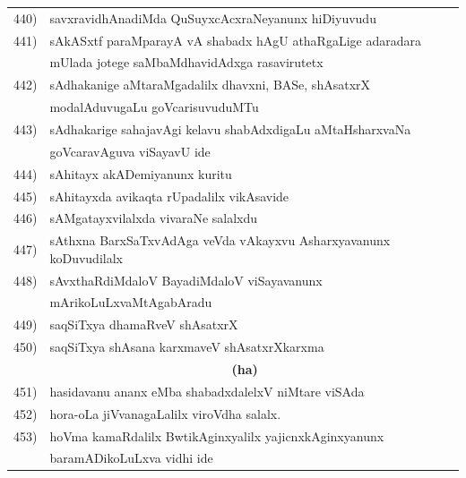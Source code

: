 \begin{longtable}{@{}cp{7.4cm}r}
440) & savxravidhAnadiMda QuSuyxcAcxraNeyanunx hiDiyuvudu & \pageref{page122}\\
441) & sAkASxtf paraMparayA vA shabadx hAgU athaRgaLige adaradara & \\
     & mUlada jotege saMbaMdhavidAdxga rasavirutetx & \pageref{page181a}\\
442) & sAdhakanige aMtaraMgadalilx dhavxni, BASe, shAsatxrX & \\
     & modalAduvugaLu goVcarisuvuduMTu  & \pageref{page189a}\\
 443) & sAdhakarige sahajavAgi kelavu shabAdxdigaLu aMtaHsharxvaNa & \\
      & goVcaravAguva viSayavU ide & \pageref{page203a}\\
 444) & sAhitayx akADemiyanunx kuritu & \pageref{page30d}\\
 445) & sAhitayxda avikaqta rUpadalilx vikAsavide & \pageref{page110b}\\
 446) & sAMgatayxvilalxda vivaraNe salalxdu & \pageref{page118}\\
 447) & sAthxna BarxSaTxvAdAga veVda vAkayxvu Asharxyavanunx koDuvudilalx & \pageref{page186}\\ 
 448) & sAvxthaRdiMdaloV BayadiMdaloV viSayavanunx & \\
      & mArikoLuLxvaMtAgabAradu & \pageref{page252a}\\
 449) & saqSiTxya dhamaRveV shAsatxrX & \pageref{page198}\\
 450) & saqSiTxya shAsana karxmaveV shAsatxrXkarxma & \pageref{page87}\\[0.3cm]  
      & \multicolumn{1}{c}{\textbf{(ha)}} & \\
 451) & hasidavanu ananx eMba shabadxdalelxV niMtare viSAda & \pageref{page201a}\\
 452) & hora-oLa jiVvanagaLalilx viroVdha salalx. & \pageref{page201z}\\
 453) & hoVma kamaRdalilx BwtikAginxyalilx yajicnxkAginxyanunx  & \\
      & baramADikoLuLxva vidhi ide & \pageref{page211a} 
\end{longtable}
